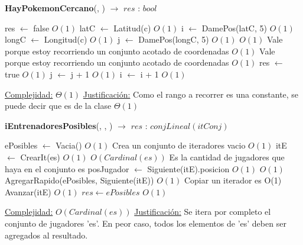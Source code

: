  \begin{algorithm}[H]{\textbf{HayPokemonCercano}(, ) $\to$ $res$ : $bool$} 
	\begin{algorithmic}
		\State res $\gets$ false	\Comment $O(1)$ 
		\State latC $\gets$ Latitud(c)	\Comment $O(1)$
		\State i $\gets$ DamePos(latC, 5) \Comment $O(1)$		
		\State longC $\gets$ Longitud(c)	\Comment $O(1)$
		\State j $\gets$ DamePos(longC, 5) \Comment $O(1)$
			\Comment $O(1)$ {Vale porque estoy recorriendo un conjunto acotado de coordenadas}
				\Comment $O(1)$ {Vale porque estoy recorriendo un conjunto acotado de coordenadas}
					\Comment $O(1)$
					\State res $\gets$ true	\Comment $O(1)$ 
				\EndIf
				\State j $\gets$ j + 1	\Comment $O(1)$
			\EndWhile
			\State i $\gets$ i + 1	\Comment $O(1)$
		\EndWhile
	
		\medskip
		\Statex \underline{Complejidad:} $\Theta(1)$
		\Statex \underline{Justificación:} Como el rango a recorrer es una constante, se puede decir que es de la clase $\Theta(1)$
     \end{algorithmic}
 \end{algorithm}

\begin{algorithm}[H]{\textbf{iEntrenadoresPosibles}(, , )  $\to$ $res$ : $conjLineal(itConj)$} 
	{}
	\begin{algorithmic}
		\State ePosibles $\gets$ Vacia()  \Comment $O(1)$ {Crea un conjunto de iteradores vacio}
			\Comment $O(1)$
			\State itE $\gets$ CrearIt(es)	\Comment $O(1)$
			 \Comment $O(Cardinal(es))$ {Es la cantidad de jugadores que haya en el conjunto es}
				\State posJugador $\gets$ Siguiente(itE).posicion	\Comment $O(1)$
				 \Comment $O(1)$
					\State AgregarRapido(ePosibles, Siguiente(itE))	\Comment $O(1)$ {Copiar un iterador es O(1)}
				\EndIf
				\State Avanzar(itE)	\Comment $O(1)$
			\EndWhile
		\EndIf
		\State $res \gets ePosibles$ \Comment $O(1)$
	
		\medskip
		\Statex \underline{Complejidad:} $O(Cardinal(es))$
		\Statex \underline{Justificación:} Se itera por completo el conjunto de jugadores 'es'. En peor caso, todos los elementos de 'es' deben ser agregados al resultado.
    \end{algorithmic}
\end{algorithm}

